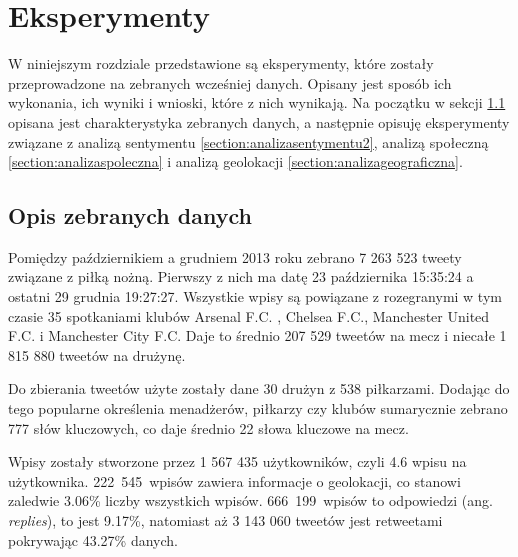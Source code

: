 \chapter{Eksperymenty}
\label{chapter:eksperymenty}
W niniejszym rozdziale przedstawione są eksperymenty, które zostały
przeprowadzone na zebranych wcześniej danych.
Opisany jest sposób ich wykonania, ich wyniki i wnioski, które z nich wynikają.
Na początku w sekcji \ref{section:opisdanych} opisana jest charakterystyka
zebranych danych, a następnie opisuję eksperymenty związane z analizą sentymentu
\ref{section:analizasentymentu2}, analizą społeczną 
\ref{section:analizaspoleczna} i analizą geolokacji 
\ref{section:analizageograficzna}.














\section{Opis zebranych danych}
\label{section:opisdanych}

Pomiędzy październikiem a grudniem 2013 roku zebrano 7 263 523 tweety związane
z piłką nożną. Pierwszy z nich ma datę 23 października 15:35:24 a ostatni
29 grudnia 19:27:27. Wszystkie wpisy są powiązane z rozegranymi w tym czasie
35 spotkaniami klubów Arsenal F.C. , Chelsea F.C., Manchester United F.C. i
Manchester City F.C. Daje to średnio 207 529 tweetów na mecz i niecałe
1 815 880 tweetów na drużynę.

Do zbierania tweetów użyte zostały dane 30 drużyn z 538 piłkarzami.
Dodając do tego popularne określenia menadżerów, piłkarzy czy klubów sumarycznie
zebrano 777 słów kluczowych, co daje średnio 22 słowa kluczowe na mecz.

Wpisy zostały stworzone przez 1 567 435 użytkowników, czyli 4.6 
wpisu na użytkownika. \mbox{222 545 wpisów} zawiera informacje o geolokacji, co stanowi
zaledwie 3.06\% liczby wszystkich wpisów. \mbox{666 199 wpisów} to odpowiedzi 
(ang. \textit{replies}), to jest 9.17\%, natomiast aż 3 143 060 tweetów
jest retweetami pokrywając 43.27\% danych.

